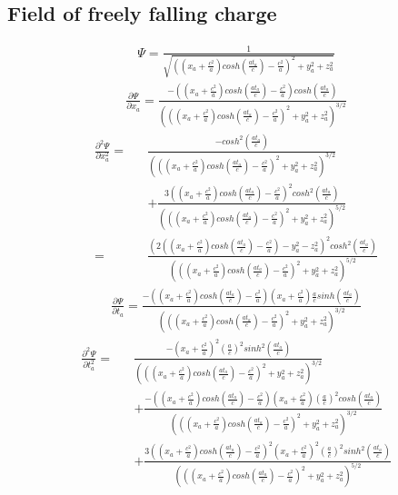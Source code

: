 \documentclass[prd,showpacs,preprint]{revtex4}
\begin{document}
\begin{appendix}
\section{Field of freely falling charge\label{app:Psi_Free_Fall}}
\begin{eqnarray}
\Psi=\frac{1}{\sqrt{((x_a+\frac{c^2}{a})cosh(\frac{at_a}{c})-\frac{c^2}{a})^2+y_a^2+z_a^2}}
\label{app:eqn:Psi_Free_Fall}
\end{eqnarray}
\begin{eqnarray}
\frac{\partial \Psi}{\partial x_a}=\frac{-((x_a+\frac{c^2}{a})cosh(\frac{at_a}{c})-\frac{c^2}{a})cosh(\frac{at_a}{c})}{(((x_a+\frac{c^2}{a})cosh(\frac{at_a}{c})-\frac{c^2}{a})^2+y_a^2+z_a^2)^{3/2}}
\end{eqnarray}
\begin{eqnarray}
\frac{\partial^2 \Psi}{\partial x_a^2}=&&\frac{-cosh^2(\frac{at_a}{c})}{(((x_a+\frac{c^2}{a})cosh(\frac{at_a}{c})-\frac{c^2}{a})^2+y_a^2+z_a^2)^{3/2}}\nonumber\\
&&+\frac{3((x_a+\frac{c^2}{a})cosh(\frac{at_a}{c})-\frac{c^2}{a})^2cosh^2(\frac{at_a}{c})}{(((x_a+\frac{c^2}{a})cosh(\frac{at_a}{c})-\frac{c^2}{a})^2+y_a^2+z_a^2)^{5/2}}\nonumber\\
=&&\frac{(2((x_a+\frac{c^2}{a})cosh(\frac{at_a}{c})-\frac{c^2}{a})-y_a^2-z_a^2)^2cosh^2(\frac{at_a}{c})}{(((x_a+\frac{c^2}{a})cosh(\frac{at_a}{c})-\frac{c^2}{a})^2+y_a^2+z_a^2)^{5/2}}
\end{eqnarray}
\begin{eqnarray}
\frac{\partial \Psi}{\partial t_a}=\frac{-((x_a+\frac{c^2}{a})cosh(\frac{at_a}{c})-\frac{c^2}{a})(x_a+\frac{c^2}{a})\frac{a}{c}sinh(\frac{at_a}{c})}{(((x_a+\frac{c^2}{a})cosh(\frac{at_a}{c})-\frac{c^2}{a})^2+y_a^2+z_a^2)^{3/2}}
\end{eqnarray}
\begin{eqnarray}
\frac{\partial^2 \Psi}{\partial t_a^2}=&&\frac{-(x_a+\frac{c^2}{a})^2(\frac{a}{c})^2sinh^2(\frac{at_a}{c})}{(((x_a+\frac{c^2}{a})cosh(\frac{at_a}{c})-\frac{c^2}{a})^2+y_a^2+z_a^2)^{3/2}}\nonumber\\
&&+\frac{-((x_a+\frac{c^2}{a})cosh(\frac{at_a}{c})-\frac{c^2}{a})(x_a+\frac{c^2}{a})(\frac{a}{c})^2cosh(\frac{at_a}{c})}{(((x_a+\frac{c^2}{a})cosh(\frac{at_a}{c})-\frac{c^2}{a})^2+y_a^2+z_a^2)^{3/2}}\nonumber\\
&&+\frac{3((x_a+\frac{c^2}{a})cosh(\frac{at_a}{c})-\frac{c^2}{a})^2(x_a+\frac{c^2}{a})^2(\frac{a}{c})^2sinh^2(\frac{at_a}{c})}{(((x_a+\frac{c^2}{a})cosh(\frac{at_a}{c})-\frac{c^2}{a})^2+y_a^2+z_a^2)^{5/2}}\nonumber\\

\end{eqnarray}
\end{appendix}
\end{document}
